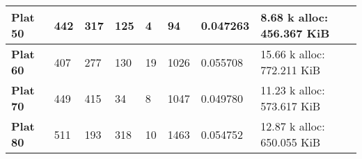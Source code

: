 \begin{table}[]
\begin{tabular}{|l|l|l|l|l|l|l|l|}
\textbf{Plat 50}                                    & 442                                                      & 317                                                        & 125                                                       & 4                                                                                                                                     & 94                                                                                                                    & 0.047263                                                                                                           & 8.68 k alloc: 456.367 KiB                          \\ \hline
\textbf{Plat 60}                                    & 407                                                      & 277                                                        & 130                                                       & 19                                                                                                                                    & 1026                                                                                                                  & 0.055708                                                                                                           & 15.66 k alloc: 772.211 KiB                         \\ \hline
\textbf{Plat 70}                                    & 449                                                      & 415                                                        & 34                                                        & 8                                                                                                                                     & 1047                                                                                                                  & 0.049780                                                                                                           & 11.23 k alloc: 573.617 KiB                         \\ \hline
\textbf{Plat 80}                                    & 511                                                      & 193                                                        & 318                                                       & 10                                                                                                                                    & 1463                                                                                                                  & 0.054752                                                                                                           & 12.87 k alloc: 650.055 KiB                         \\ \hline

\end{tabular}
\end{table}
